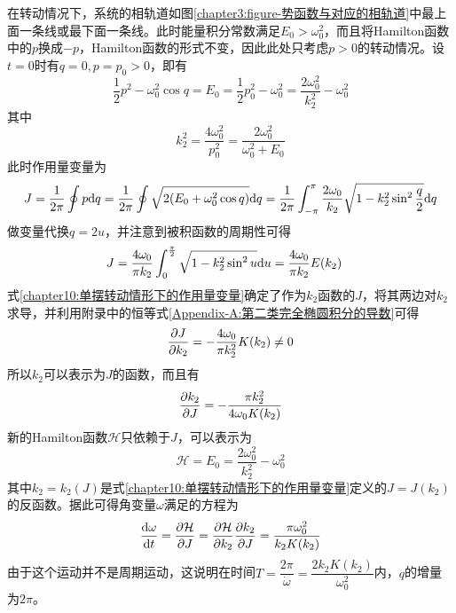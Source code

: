在转动情况下，系统的相轨道如图\ref{chapter3:figure-势函数与对应的相轨道}中最上面一条线或最下面一条线。此时能量积分常数满足$E_0>\omega_0^2$，而且将Hamilton函数中的$p$换成$-p$，Hamilton函数的形式不变，因此此处只考虑$p>0$的转动情况。设$t=0$时有$q=0, p=p_0>0$，即有
\begin{equation}
	\frac12 p^2-\omega_0^2\cos q = E_0 = \frac12p_0^2 - \omega_0^2 = \frac{2\omega_0^2}{k_2^2} - \omega_0^2
	\label{chapter10:单摆转动情形下能量积分的具体形式}
\end{equation}
其中
\begin{equation}
	k_2^2 = \frac{4\omega_0^2}{p_0^2} = \frac{2\omega_0^2}{\omega_0^2+E_0}
\end{equation}
此时作用量变量为
\begin{align}
	J = \frac{1}{2\pi} \oint p\mathrm{d} q = \frac{1}{2\pi} \oint \sqrt{2(E_0+\omega_0^2\cos q)}\mathrm{d} q = \frac{1}{2\pi} \int_{-\pi}^\pi \frac{2\omega_0}{k_2}\sqrt{1-k_2^2\sin^2\frac{q}{2}} \mathrm{d} q
\end{align}
做变量代换$q=2u$，并注意到被积函数的周期性可得
\begin{align}
	J &= \frac{4\omega_0}{\pi k_2} \int_0^{\frac{\pi}{2}}\sqrt{1-k_2^2\sin^2u}\mathrm{d} u = \frac{4\omega_0}{\pi k_2} E(k_2)
	\label{chapter10:单摆转动情形下的作用量变量}
\end{align}
式\eqref{chapter10:单摆转动情形下的作用量变量}确定了作为$k_2$函数的$J$，将其两边对$k_2$求导，并利用附录中的恒等式\eqref{Appendix-A:第二类完全椭圆积分的导数}可得
\begin{equation}
	\frac{\partial J}{\partial k_2} = -\frac{4\omega_0}{\pi k_2^2} K(k_2) \neq 0
\end{equation}
所以$k_2$可以表示为$J$的函数，而且有
\begin{equation}
	\frac{\partial k_2}{\partial J} = -\frac{\pi k_2^2}{4\omega_0K(k_2)}
\end{equation}
新的Hamilton函数$\mathcal{H}$只依赖于$J$，可以表示为
\begin{equation}
	\mathcal{H} = E_0 = \frac{2\omega_0^2}{k_2^2}-\omega_0^2
\end{equation}
其中$k_2=k_2(J)$是式\eqref{chapter10:单摆转动情形下的作用量变量}定义的$J=J(k_2)$的反函数。据此可得角变量$\omega$满足的方程为
\begin{equation}
	\dfrac{\mathrm{d} \omega}{\mathrm{d} t} = \frac{\partial \mathcal{H}}{\partial J} = \frac{\partial \mathcal{H}}{\partial k_2} \frac{\partial k_2}{\partial J} = \frac{\pi \omega_0^2}{k_2K(k_2)}
\end{equation}
由于这个运动并不是周期运动，这说明在时间$T=\dfrac{2\pi}{\dot{\omega}}=\dfrac{2k_2K(k_2)}{\omega_0^2}$内，$q$的增量为$2\pi$。


